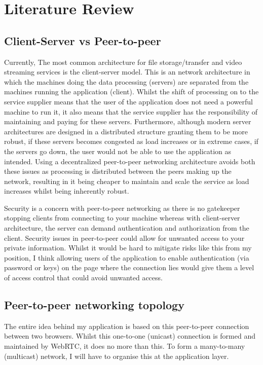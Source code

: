 \documentclass[]{report}
\begin{document}
	\section{Literature Review}
		\subsection*{Client-Server vs Peer-to-peer }
			Currently, The most common architecture for file storage/transfer and video streaming services is the client-server model. This is an network architecture in which the machines doing the data processing (servers) are separated from the machines running the application (client). Whilst the shift of processing on to the service supplier means that the user of the application does not need a powerful machine to run it, it also means that the service supplier has the responsibility of maintaining and paying for these servers. Furthermore, although modern server architectures are designed in a distributed structure granting them to be more robust, if these servers becomes congested as load increases or in extreme cases, if the servers go down, the user would not be able to use the application as intended. Using a decentralized peer-to-peer networking architecture avoids both these issues as processing is distributed between the peers making up the network, resulting in it being cheaper to maintain and scale the service as load increases whilst being inherently robust. 
		
			Security is a concern with peer-to-peer networking as there is no gatekeeper stopping clients from connecting to your machine whereas with client-server architecture, the server can demand authentication and authorization from the client. Security issues in peer-to-peer could allow for unwanted access to your private information. Whilst it would be hard to mitigate risks like this from my position, I think allowing users of the application to enable authentication (via password or keys) on the page where the connection lies would give them a level of access control that could avoid unwanted access.
			
		
		\subsection*{Peer-to-peer networking topology}
			The entire idea behind my application is based on this peer-to-peer connection between two browsers. Whilst this one-to-one (unicast) connection is formed and maintained by WebRTC, it does no more than this. To form a many-to-many (multicast) network, I will have to organise this at the application layer.
		
\end{document}

